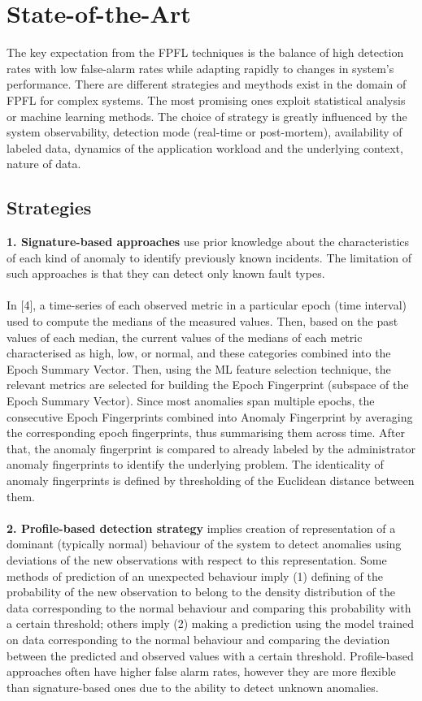 \documentclass[]{usiinfprospectus}
\begin{document}
\section{State-of-the-Art}
%
The key expectation from the FPFL techniques is the balance of high detection rates with low false-alarm rates while adapting rapidly to changes in system's performance. There are different strategies and meythods exist in the domain of FPFL for complex systems. The most promising ones exploit statistical analysis or machine learning methods. The choice of strategy is greatly influenced by the system observability, detection mode (real-time or post-mortem), availability of labeled data, dynamics of the application workload and the underlying context, nature of data.
%
\subsection{Strategies}
\textbf{1. Signature-based approaches} use prior knowledge about the characteristics of each kind of anomaly to identify previously known incidents. The limitation of such approaches is that they can detect only known fault types.\\\\
In [4], a time-series of each observed metric in a particular epoch (time interval) used to compute the medians of the measured values. Then, based on the past values of each median, the current values of the medians of each metric characterised as high, low, or normal, and these categories combined into the Epoch Summary Vector. Then, using the ML feature selection technique, the relevant metrics are selected for building the Epoch Fingerprint (subspace of the Epoch Summary Vector). Since most anomalies span multiple epochs, the consecutive Epoch Fingerprints combined into Anomaly Fingerprint by averaging the corresponding epoch fingerprints, thus summarising them across time. After that, the anomaly fingerprint is compared to already labeled by the administrator anomaly fingerprints to identify the underlying problem. The identicality of anomaly fingerprints is defined by thresholding of the Euclidean distance between them.\\\\
%
\textbf{2. Profile-based detection strategy} implies creation of representation of a dominant (typically normal) behaviour of the system to detect anomalies using deviations of the new observations with respect to this representation. Some methods of prediction of an unexpected behaviour imply (1) defining of the probability of the new observation to belong to the density distribution of the data corresponding to the normal behaviour and comparing this probability with a certain threshold; others imply (2) making a prediction using the model trained on data corresponding to the normal behaviour and comparing the deviation between the predicted and observed values with a certain threshold. Profile-based approaches often have higher false alarm rates, however they are more flexible than signature-based ones due to the ability to detect unknown anomalies.\\\\
\end{document}
